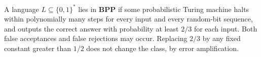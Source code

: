 
A language $L\subseteq\{0,1\}^*$ lies in $\mathbf{BPP}$ if some probabilistic Turing machine halts within polynomially many steps for every input and every random-bit sequence, and outputs the correct answer with probability at least $2/3$ for each input. Both false acceptances and false rejections may occur. Replacing $2/3$ by any fixed constant greater than $1/2$ does not change the class, by error amplification.
